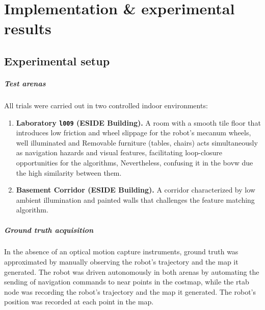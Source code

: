 
\chapter{Implementation \& experimental results}\label{ch:implementation}

\section{Experimental setup}
\label{sec:exp_setup}

\paragraph*{Test arenas}
\label{sec:test_arenas}

All trials were carried out in two controlled indoor environments:

\begin{enumerate}[label=(\alph*)]
  \item \textbf{Laboratory \texttt{l009} (ESIDE Building).}
        A room with a smooth tile floor that introduces low friction and wheel slippage for the robot's mecanum wheels, well illuminated and Removable furniture (tables, chairs) acts simultaneously as navigation hazards and visual features, facilitating loop-closure opportunities for the algorithms, Nevertheless, confusing it in the \gls{bovw} due the high similarity between them.

  \item \textbf{Basement Corridor (ESIDE Building).}
        A corridor characterized by low ambient illumination and painted walls that challenges the feature matching algorithm.
\end{enumerate}


\paragraph*{Ground truth acquisition}
\label{sec:gt_acquisition}

In the absence of an optical motion capture instruments, ground truth was approximated by manually observing the robot's trajectory and the map it generated. The robot was driven autonomously in both arenas by automating the sending of navigation commands to near points in the costmap, while the \gls{rtab} node was recording the robot's trajectory and the map it generated. The robot's position was recorded at each point in the map. 

